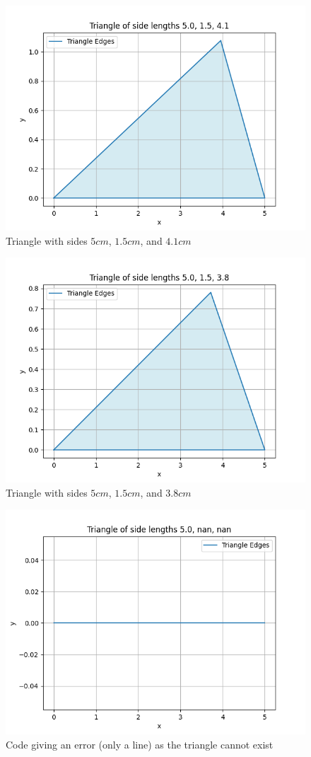 \documentclass[journal]{IEEEtran}
\begin{document}
\setcounter{figure}{1} %
\begin{figure}[h!]
   \centering
   \includegraphics[width=0.7\linewidth]{figs/fig2.png}
   \caption{Triangle with sides $5cm$, $1.5cm$, and $4.1cm$}
\end{figure}

\setcounter{figure}{2} %
\begin{figure}[h!]
   \centering
   \includegraphics[width=0.7\linewidth]{figs/fig3.png}
   \caption{Triangle with sides $5cm$, $1.5cm$, and $3.8cm$}
\end{figure}

\setcounter{figure}{3} %
\begin{figure}[h!]
   \centering
   \includegraphics[width=0.7\linewidth]{figs/fig4.png}
   \caption{Code giving an error (only a line) as the triangle cannot exist}
\end{figure}
\end{document}
